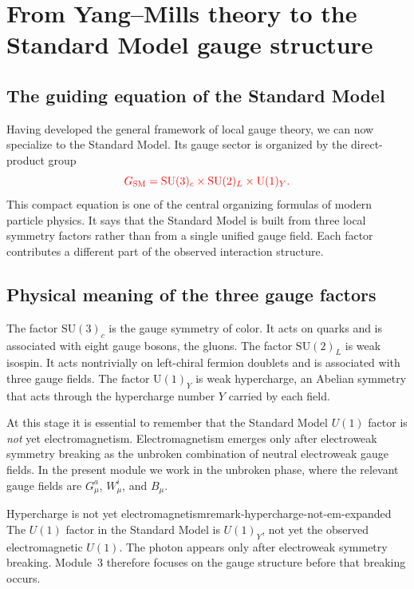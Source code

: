\documentclass[11pt,a4paper]{article}
\newcommand{\SMgauge}{\mathrm{SU}(3)_c \times \mathrm{SU}(2)_L \times \mathrm{U}(1)_Y}
\newcommand{\SUc}{\mathrm{SU}(3)_c}
\newcommand{\SUw}{\mathrm{SU}(2)_L}
\newcommand{\UY}{\mathrm{U}(1)_Y}
\begin{document}
\section{From Yang--Mills theory to the Standard Model gauge structure}

\subsection{The guiding equation of the Standard Model}

Having developed the general framework of local gauge theory, we can now specialize to the Standard Model. Its gauge sector is organized by the direct-product group
\begin{equation}
{\color{red}G_{\text{SM}}=\SMgauge.}
\label{eq:sm-gauge-group-expanded}
\end{equation}
This compact equation is one of the central organizing formulas of modern particle physics. It says that the Standard Model is built from three local symmetry factors rather than from a single unified gauge field. Each factor contributes a different part of the observed interaction structure.



\subsection{Physical meaning of the three gauge factors}

The factor \(\SUc\) is the gauge symmetry of color. It acts on quarks and is associated with eight gauge bosons, the gluons. The factor \(\SUw\) is weak isospin. It acts nontrivially on left-chiral fermion doublets and is associated with three gauge fields. The factor \(\UY\) is weak hypercharge, an Abelian symmetry that acts through the hypercharge number \(Y\) carried by each field.

At this stage it is essential to remember that the Standard Model \(U(1)\) factor is \emph{not} yet electromagnetism. Electromagnetism emerges only after electroweak symmetry breaking as the unbroken combination of neutral electroweak gauge fields. In the present module we work in the unbroken phase, where the relevant gauge fields are \(G_\mu^a\), \(W_\mu^i\), and \(B_\mu\).

\begin{remarkbox}{Hypercharge is not yet electromagnetism}{remark-hypercharge-not-em-expanded}
The \(U(1)\) factor in the Standard Model is \(U(1)_Y\), not yet the observed electromagnetic \(U(1)\). The photon appears only after electroweak symmetry breaking. Module~3 therefore focuses on the gauge structure before that breaking occurs.
\end{remarkbox}
\end{document}
